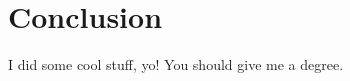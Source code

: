 \chapter{Conclusion} \label{sec:conclusion}

I did some cool stuff, yo! You should give me a degree.
